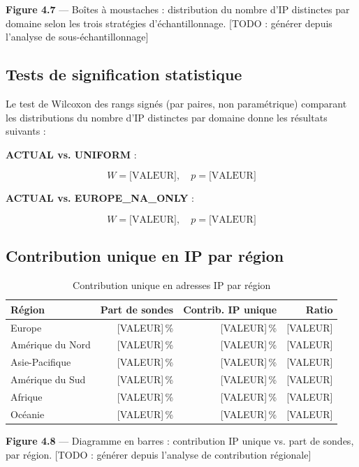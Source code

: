 \textbf{Figure 4.7} --- Boîtes à moustaches : distribution du nombre d'IP distinctes par domaine selon les trois stratégies d'échantillonnage. [TODO : générer depuis l'analyse de sous-échantillonnage]

\subsection{Tests de signification statistique}
\label{subsec:4.4.2}

Le test de Wilcoxon des rangs signés (par paires, non paramétrique) comparant les distributions du nombre d'IP distinctes par domaine donne les résultats suivants :

\textbf{ACTUAL vs. UNIFORM} :

\[
W = \text{[VALEUR]}, \quad p = \text{[VALEUR]}
\]

\textbf{ACTUAL vs. EUROPE\_NA\_ONLY} :

\[
W = \text{[VALEUR]}, \quad p = \text{[VALEUR]}
\]

\subsection{Contribution unique en IP par région}
\label{subsec:4.4.3}

\begin{table}[H]
\centering
\small
\begin{tabularx}{\linewidth}{X r r r}
\toprule
\textbf{Région} & \textbf{Part de sondes} & \textbf{Contrib. IP unique} & \textbf{Ratio} \\
\midrule
Europe & [VALEUR]\,\% & [VALEUR]\,\% & [VALEUR] \\
Amérique du Nord & [VALEUR]\,\% & [VALEUR]\,\% & [VALEUR] \\
Asie-Pacifique & [VALEUR]\,\% & [VALEUR]\,\% & [VALEUR] \\
Amérique du Sud & [VALEUR]\,\% & [VALEUR]\,\% & [VALEUR] \\
Afrique & [VALEUR]\,\% & [VALEUR]\,\% & [VALEUR] \\
Océanie & [VALEUR]\,\% & [VALEUR]\,\% & [VALEUR] \\
\bottomrule
\end{tabularx}
\caption{Contribution unique en adresses IP par région}
\label{tab:ip_contribution}
\end{table}

\textbf{Figure 4.8} --- Diagramme en barres : contribution IP unique vs. part de sondes, par région. [TODO : générer depuis l'analyse de contribution régionale]

